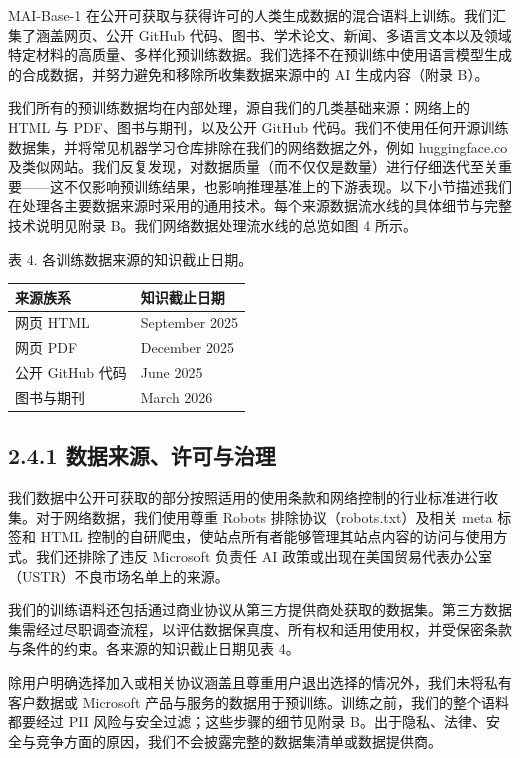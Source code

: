 MAI-Base-1 在公开可获取与获得许可的人类生成数据的混合语料上训练。我们汇集了涵盖网页、公开 GitHub 代码、图书、学术论文、新闻、多语言文本以及领域特定材料的高质量、多样化预训练数据。我们选择不在预训练中使用语言模型生成的合成数据，并努力避免和移除所收集数据来源中的 AI 生成内容（附录 B）。

我们所有的预训练数据均在内部处理，源自我们的几类基础来源：网络上的 HTML 与 PDF、图书与期刊，以及公开 GitHub 代码。我们不使用任何开源训练数据集，并将常见机器学习仓库排除在我们的网络数据之外，例如 huggingface.co 及类似网站。我们反复发现，对数据质量（而不仅仅是数量）进行仔细迭代至关重要——这不仅影响预训练结果，也影响推理基准上的下游表现。以下小节描述我们在处理各主要数据来源时采用的通用技术。每个来源数据流水线的具体细节与完整技术说明见附录 B。我们网络数据处理流水线的总览如图 4 所示。



表 4. 各训练数据来源的知识截止日期。

{\def\LTcaptype{none} %
\begin{longtable}[]{@{}|l|l|@{}}
\toprule\noalign{}
\endhead
\bottomrule\noalign{}
\endlastfoot
\hline
来源族系 & 知识截止日期 \\
\hline
网页 HTML & September 2025 \\
\hline
网页 PDF & December 2025 \\
\hline
公开 GitHub 代码 & June 2025 \\
\hline
图书与期刊 & March 2026 \\
\hline
\end{longtable}
}

\subsection{2.4.1 数据来源、许可与治理}\label{data-sources-licensing-and-governance}

我们数据中公开可获取的部分按照适用的使用条款和网络控制的行业标准进行收集。对于网络数据，我们使用尊重 Robots 排除协议（robots.txt）及相关 meta 标签和 HTML 控制的自研爬虫，使站点所有者能够管理其站点内容的访问与使用方式。我们还排除了违反 Microsoft 负责任 AI 政策或出现在美国贸易代表办公室（USTR）不良市场名单上的来源。

我们的训练语料还包括通过商业协议从第三方提供商处获取的数据集。第三方数据集需经过尽职调查流程，以评估数据保真度、所有权和适用使用权，并受保密条款与条件的约束。各来源的知识截止日期见表 4。

除用户明确选择加入或相关协议涵盖且尊重用户退出选择的情况外，我们未将私有客户数据或 Microsoft 产品与服务的数据用于预训练。训练之前，我们的整个语料都要经过 PII 风险与安全过滤；这些步骤的细节见附录 B。出于隐私、法律、安全与竞争方面的原因，我们不会披露完整的数据集清单或数据提供商。


